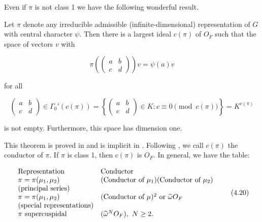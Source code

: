 Even if $\pi$ is not class 1 we have the following wonderful result.

\begin{theorem}\label{thm:4.24}

Let $\pi$ denote any irreducible admissible (infinite-dimensional) representation of $G$ with central character $\psi$. Then there is a largest ideal $c(\pi)$ of $O_F$ such that the space of vectors $v$ with

\begin{equation}\label{eq:4.18}
\pi\!\left(\begin{pmatrix} a & b \\ c & d \end{pmatrix}\right)v = \psi(a)v\tag{4.18}
\end{equation}

for all

\begin{equation}\label{eq:4.19}
\begin{pmatrix} a & b \\ c & d \end{pmatrix} \in \Gamma_0'(c(\pi)) = \left\{\begin{pmatrix} a & b \\ c & d \end{pmatrix} \in K: c \equiv 0 \pmod{c(\pi)}\right\} = K^{c(\pi)}\tag{4.19}
\end{equation}

is not empty. Furthermore, this space has dimension one.

\end{theorem}

\begin{remark}\label{rem:4.25}

This theorem is proved in \cite{Casselman} and is implicit in \cite{JacquetLanglands}. Following \cite{Casselman}, we call $c(\pi)$ the conductor of $\pi$. If $\pi$ is class 1, then $c(\pi)$ is $O_F$. In general, we have the table:

\begin{equation}\label{eq:4.20}
\begin{array}{l l}
\text{Representation} & \text{Conductor}\\
\pi = \pi(\mu_1, \mu_2) & (\text{Conductor of } \mu_1)(\text{Conductor of } \mu_2)\\
\text{(principal series)} & \\
\pi = \pi(\mu_1, \mu_2) & (\text{Conductor of } \mu)^2 \text{ or } \widetilde{\omega}O_F\\
\text{(special representations)} & \\
\pi \text{ supercuspidal} & (\widetilde{\omega}^N O_F), \ N \geq 2.
\end{array}\tag{4.20}
\end{equation}

\end{remark}

